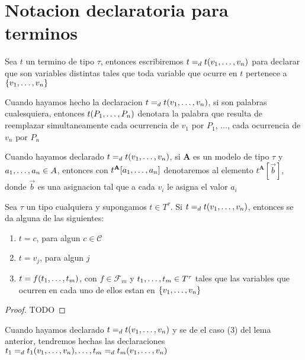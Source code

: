 
\section{Notacion declaratoria para terminos}
\begin{definition}
  Sea $t$ un termino de tipo $\tau$, entonces escribiremos $t =_d t(v_{1}, \dots, v_{n})$
  para declarar que  son variables distintas tales que toda variable que ocurre en 
  $t$ pertenece a $\{v_{1}, \dots, v_{n}\}$
\end{definition}

\begin{convention}
  Cuando hayamos hecho la declaracion $t =_d t(v_{1}, \dots, v_{n})$, si 
  son palabras cualesquiera, entonces $t(P_{1}, \dots, P_{n})$ denotara la palabra que resulta de reemplazar
  simultaneamente cada ocurrencia de $v_1$ por $P_1$, $\dots$, cada ocurrencia de $v_n$ por $P_n$
\end{convention}
\begin{convention}
  Cuando hayamos declarado $t =_d t(v_{1}, \dots, v_{n})$, si $\mathbf{A}$ es un modelo de 
  tipo $\tau$ y $a_{1}, \dots, a_{n} \in A$, entonces con $t^\mathbf{A}[a_{1}, \dots, a_{n}]$
  denotaremos al elemento $t^\mathbf{A}[\vec{b}]$, donde $\vec{b}$ es una asignacion tal que a cada
  $v_i$ le asigna el valor $a_i$
\end{convention}

\begin{lemma}
  Sea $\tau$ un tipo cualquiera y supongamos $t \in T^\tau$. Si $t =_d t(v_{1}, \dots, v_{n})$,
  entonces se da alguna de las siguientes: \begin{enumerate}
    \item $t = c$, para algun $c \in \mathcal{C}$
    \item $t = v_j$, para algun $j$
    \item $t = f(t_{1}, \dots, t_{m})$, con $f \in \mathcal{F}_m$ y $t_{1}, \dots, t_{m} \in T^\tau$ tales
    que las variables que ocurren en cada uno de ellos estan en $\{v_{1}, \dots, v_{n}\}$
  \end{enumerate}
\end{lemma}
\begin{proof}
  TODO
\end{proof}

\begin{convention}
  Cuando hayamos declarado $t =_d t(v_{1}, \dots, v_{n})$ y se de el caso (3) del lema anterior,
  tendremos hechas las declaraciones $t_1 =_d t_1(v_{1}, \dots, v_{n}), \dots, t_m =_d t_m(v_{1}, \dots, v_{n})$
\end{convention}

